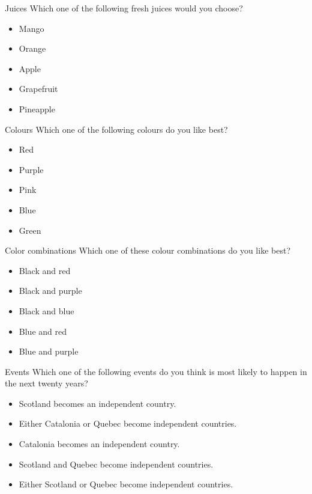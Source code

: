 \documentclass{beamer}
\begin{document}
\begin{frame}{Juices}
Which one of the following fresh juices would you choose?

\begin{itemize}
	\item Mango
	\item Orange
	\item Apple
	\item Grapefruit
	\item Pineapple
\end{itemize}
\end{frame}

\begin{frame}{Colours}
Which one of the following colours do you like best?

\begin{itemize}
	\item Red
	\item Purple
	\item Pink
	\item Blue
	\item Green
\end{itemize}
\end{frame}

\begin{frame}{Color combinations}
Which one of these colour combinations do you like best?

\begin{itemize}
	\item Black and red
	\item Black and purple
	\item Black and blue
	\item Blue and red
	\item Blue and purple
\end{itemize}
\end{frame}

\begin{frame}{Events}
Which one of the following events do you think is most likely to happen in the next twenty years?

\begin{itemize}
	\item Scotland becomes an independent country.
	\item Either Catalonia or Quebec become independent countries.
	\item Catalonia becomes an independent country.
	\item Scotland and Quebec become independent countries.
	\item Either Scotland or Quebec become independent countries.
\end{itemize}
\end{frame}
\end{document}

